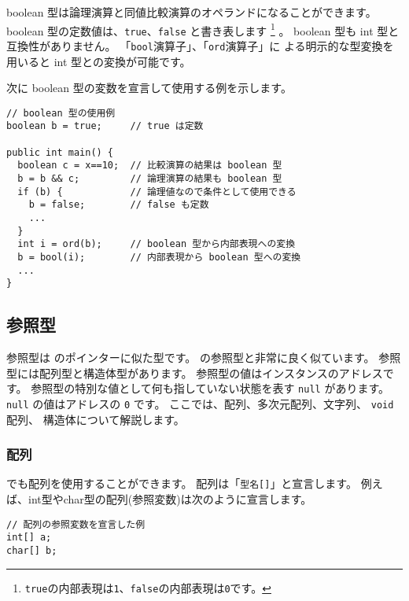boolean 型は論理演算と同値比較演算のオペランドになることができます。
boolean 型の定数値は、\verb/true/、\verb/false/ と書き表します
\footnote{{\tt true}の内部表現は{\tt 1}、{\tt false}の内部表現は{\tt 0}です。}
。
boolean 型も int 型と互換性がありません。
「\verb/bool/演算子」、「\verb/ord/演算子」に
よる明示的な型変換を用いると int 型との変換が可能です。

次に boolean 型の変数を宣言して使用する例を示します。

\begin{mylist}
\begin{verbatim}
// boolean 型の使用例
boolean b = true;     // true は定数

public int main() {
  boolean c = x==10;  // 比較演算の結果は boolean 型
  b = b && c;         // 論理演算の結果も boolean 型
  if (b) {            // 論理値なので条件として使用できる
    b = false;        // false も定数
    ...
  }
  int i = ord(b);     // boolean 型から内部表現への変換
  b = bool(i);        // 内部表現から boolean 型への変換
  ...
}
\end{verbatim}
\end{mylist}

\subsection{参照型}
\label{chap3:ref}

参照型は \cl のポインターに似た型です。
\javal の参照型と非常に良く似ています。
参照型には配列型と構造体型があります。
参照型の値はインスタンスのアドレスです。
参照型の特別な値として何も指していない状態を表す \verb/null/ があります。
\verb/null/ の値はアドレスの \verb/0/ です。
ここでは、配列、多次元配列、文字列、 \verb/void/ 配列、
構造体について解説します。

\subsubsection{配列}
\label{chap3:array}
\cmml でも配列を使用することができます。
配列は「\verb/型名[]/」と宣言します。
例えば、int型やchar型の配列(参照変数)は次のように宣言します。

\begin{mylist}
\begin{verbatim}
// 配列の参照変数を宣言した例
int[] a;
char[] b;
\end{verbatim}
\end{mylist}


